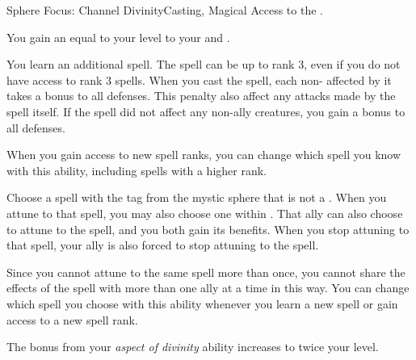   \begin{magicalfeat}{Sphere Focus: Channel Divinity}{Casting, Magical}
    \featpre Access to the  .

     You gain an  equal to your level to your  and .

     You learn an additional spell.
    The spell can be up to rank 3, even if you do not have access to rank 3 spells.
    When you cast the spell, each non- affected by it  takes a  bonus to all defenses.
    This penalty also affect any attacks made by the spell itself.
    If the spell did not affect any non-ally creatures, you  gain a  bonus to all defenses.

    When you gain access to new spell ranks, you can change which spell you know with this ability, including spells with a higher rank.

     Choose a spell with the  tag from the  mystic sphere that is not a .
    When you attune to that spell, you may also choose one  within \medrange.
    That ally can also choose to attune to the spell, and you both gain its benefits.
    When you stop attuning to that spell, your ally is also forced to stop attuning to the spell.

    Since you cannot attune to the same spell more than once, you cannot share the effects of the spell with more than one ally at a time in this way.
    You can change which spell you choose with this ability whenever you learn a new spell or gain access to a new spell rank.

     The bonus from your \textit{aspect of divinity} ability increases to twice your level.
  \end{magicalfeat}

